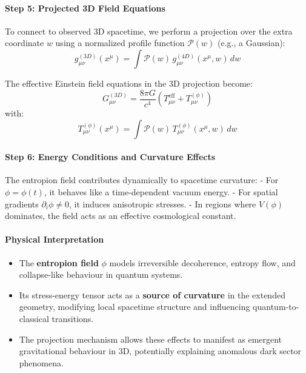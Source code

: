 \documentclass[12pt]{article}
\begin{document}
\paragraph{Step 5: Projected 3D Field Equations}

To connect to observed 3D spacetime, we perform a projection over the extra coordinate \(w\) using a normalized profile function \(\mathcal{P}(w)\) (e.g., a Gaussian):
\begin{equation}
g^{(3D)}_{\mu\nu}(x^\mu) = \int \mathcal{P}(w)\, g^{(4D)}_{\mu\nu}(x^\mu, w)\, dw
\label{eq:A7_ProjectedMetric}
\end{equation}

The effective Einstein field equations in the 3D projection become:
\begin{equation}
G^{(3D)}_{\mu\nu} = \frac{8\pi G}{c^4} \left( T^{\text{eff}}_{\mu\nu} + T^{(\phi)}_{\mu\nu} \right)
\label{eq:A7_ProjectedEFE}
\end{equation}
with:
\begin{equation}
T^{(\phi)}_{\mu\nu}(x^\mu) = \int \mathcal{P}(w)\, T^{(\phi)}_{\mu\nu}(x^\mu, w)\, dw
\label{eq:A7_ProjectedStress}
\end{equation}

\paragraph{Step 6: Energy Conditions and Curvature Effects}

The entropion field contributes dynamically to spacetime curvature:
- For \(\phi = \phi(t)\), it behaves like a time-dependent vacuum energy.
- For spatial gradients \(\partial_i \phi \neq 0\), it induces anisotropic stresses.
- In regions where \(V(\phi)\) dominates, the field acts as an effective cosmological constant.

\paragraph{Physical Interpretation}

\begin{itemize}
  \item The \textbf{entropion field} \(\phi\) models irreversible decoherence, entropy flow, and collapse-like behaviour in quantum systems.
  \item Its stress-energy tensor acts as a \textbf{source of curvature} in the extended geometry, modifying local spacetime structure and influencing quantum-to-classical transitions.
  \item The projection mechanism allows these effects to manifest as emergent gravitational behaviour in 3D, potentially explaining anomalous dark sector phenomena.
\end{itemize}
\end{document}
